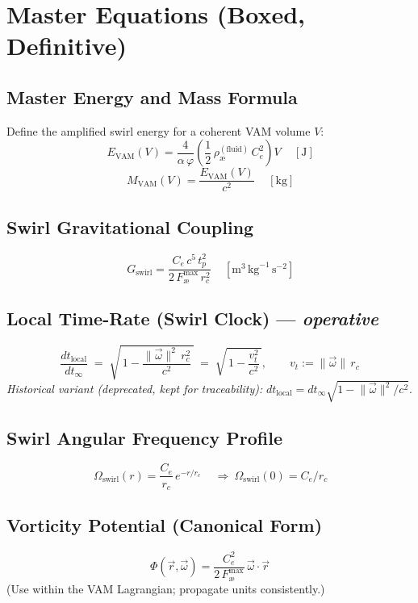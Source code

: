 \documentclass[11pt,a4paper]{article}
\newcommand{\aeFluid}{\rho_{\text{\ae}}^{(\text{fluid})}}
\newcommand{\Ce}{C_e}
\newcommand{\rc}{r_c}
\newcommand{\tp}{t_p}
\newcommand{\aeforce}{F_{\text{\ae}}^{\max}}
\newcommand{\Om}{\Omega_{\text{swirl}}}
\newcommand{\phig}{\varphi}
\begin{document}
    \section{Master Equations (Boxed, Definitive)}
    \label{sec:masters}

    \subsection{Master Energy and Mass Formula}
    Define the amplified swirl energy for a coherent VAM volume $V$:
    \[
        \boxed{\, E_{\text{VAM}}(V) = \frac{4}{\alpha\,\phig} \left( \frac{1}{2}\,\aeFluid\,\Ce^{2} \right) V \,}\quad [\text{J}]
    \]
    \[
        \boxed{\, M_{\text{VAM}}(V) = \frac{E_{\text{VAM}}(V)}{c^{2}} \,}\quad [\text{kg}]
    \]

    \subsection{Swirl Gravitational Coupling}
    \[
        \boxed{\, G_{\text{swirl}} = \frac{\Ce\,c^{5}\,\tp^{2}}{2\,\aeforce\,\rc^{2}} \,}\quad [\text{m}^3\,\text{kg}^{-1}\,\text{s}^{-2}]
    \]

    \subsection{Local Time-Rate (Swirl Clock) — \emph{operative}}
    \label{sec:time-rate}
    \[
        \boxed{\, \frac{dt_{\text{local}}}{dt_{\infty}} \;=\; \sqrt{\,1 - \frac{\lVert\vec{\omega}\rVert^{2}\,\rc^{2}}{c^{2}}\,}
        \;=\; \sqrt{\,1 - \frac{v_t^{2}}{c^{2}}\,},\qquad v_t:=\lVert\vec{\omega}\rVert\,\rc \,}
    \]
    \textit{Historical variant (deprecated, kept for traceability):} $dt_{\text{local}} = dt_{\infty}\sqrt{1 - \lVert\vec{\omega}\rVert^{2}/c^{2}}$.

    \subsection{Swirl Angular Frequency Profile}
    \[
        \boxed{\, \Om(r) = \frac{\Ce}{\rc}\, e^{-r/\rc} \,}\quad \Rightarrow\ \Om(0)=\Ce/\rc
    \]

    \subsection{Vorticity Potential (Canonical Form)}
    \[
        \boxed{\, \Phi(\vec r,\vec\omega) = \frac{\Ce^{2}}{2\,\aeforce}\,\vec\omega\cdot\vec r \,}
    \]
    (Use within the VAM Lagrangian; propagate units consistently.)
\end{document}
